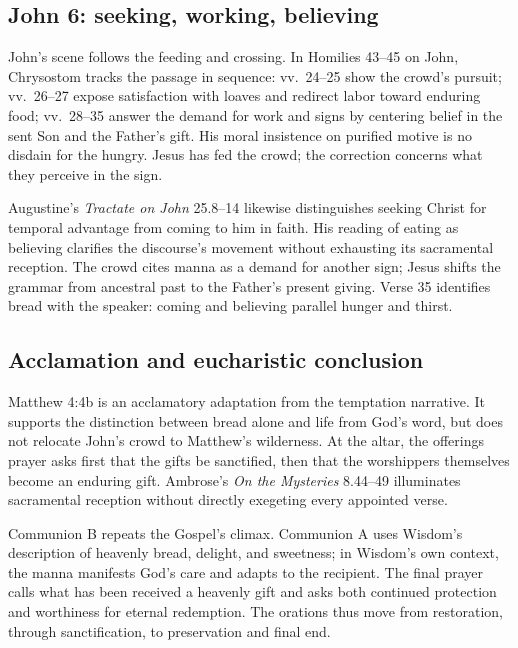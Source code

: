 \subsection*{John 6: seeking, working, believing}

John's scene follows the feeding and crossing. In Homilies 43--45 on John,
Chrysostom tracks the passage in sequence: vv.~24--25 show the crowd's pursuit;
vv.~26--27 expose satisfaction with loaves and redirect labor toward enduring
food; vv.~28--35 answer the demand for work and signs by centering belief in
the sent Son and the Father's gift. His moral insistence on purified motive is no
disdain for the hungry. Jesus has fed the crowd; the
correction concerns what they perceive in the sign.

Augustine's \emph{Tractate on John} 25.8--14 likewise distinguishes seeking
Christ for temporal advantage from coming to him in faith. His reading of
eating as believing clarifies the discourse's movement without exhausting its
sacramental reception. The crowd cites manna as a demand for another sign;
Jesus shifts the grammar from ancestral past to the Father's present giving.
Verse 35 identifies bread with the speaker: coming and believing parallel
hunger and thirst.

\subsection*{Acclamation and eucharistic conclusion}

Matthew 4:4b is an acclamatory adaptation from the temptation narrative. It
supports the distinction between bread alone and life from God's word, but
does not relocate John's crowd to Matthew's wilderness. At the altar, the
offerings prayer asks first that the gifts be sanctified, then that the
worshippers themselves become an enduring gift. Ambrose's \emph{On the
Mysteries} 8.44--49 illuminates sacramental reception without directly
exegeting every appointed verse.

Communion B repeats the Gospel's climax. Communion A uses Wisdom's description
of heavenly bread, delight, and sweetness; in Wisdom's own context, the manna
manifests God's care and adapts to the recipient. The final prayer calls what
has been received a heavenly gift and asks both continued protection and
worthiness for eternal redemption. The orations thus move from restoration,
through sanctification, to preservation and final end.

